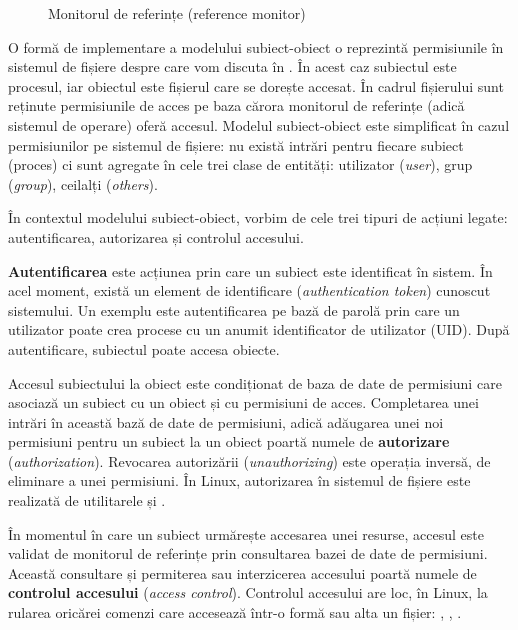 \begin{figure}[htbp]
  \centering
  \def\svgwidth{\columnwidth}
  
  \caption{Monitorul de referințe (reference monitor)}
  \label{fig:sec:reference-monitor}
\end{figure}

O formă de implementare a modelului subiect-obiect o reprezintă permisiunile în sistemul de fișiere despre care vom discuta în .
În acest caz subiectul este procesul, iar obiectul este fișierul care se dorește accesat.
În cadrul fișierului sunt reținute permisiunile de acces pe baza cărora monitorul de referințe (adică sistemul de operare) oferă accesul.
Modelul subiect-obiect este simplificat în cazul permisiunilor pe sistemul de fișiere: nu există intrări pentru fiecare subiect (proces) ci sunt agregate în cele trei clase de entități: utilizator (\textit{user}), grup (\textit{group}), ceilalți (\textit{others}).

În contextul modelului subiect-obiect, vorbim de cele trei tipuri de acțiuni legate: autentificarea, autorizarea și controlul accesului.

\textbf{Autentificarea} este acțiunea prin care un subiect este identificat în sistem.
În acel moment, există un element de identificare (\textit{authentication token}) cunoscut sistemului.
Un exemplu este autentificarea pe bază de parolă prin care un utilizator poate crea procese cu un anumit identificator de utilizator (UID).
După autentificare, subiectul poate accesa obiecte.

Accesul subiectului la obiect este condiționat de baza de date de permisiuni care asociază un subiect cu un obiect și cu permisiuni de acces.
Completarea unei intrări în această bază de date de permisiuni, adică adăugarea unei noi permisiuni pentru un subiect la un obiect poartă numele de \textbf{autorizare} (\textit{authorization}).
Revocarea autorizării (\textit{unauthorizing}) este operația inversă, de eliminare a unei permisiuni.
În Linux, autorizarea în sistemul de fișiere este realizată de utilitarele  și .

În momentul în care un subiect urmărește accesarea unei resurse, accesul este validat de monitorul de referințe prin consultarea bazei de date de permisiuni.
Această consultare și permiterea sau interzicerea accesului poartă numele de \textbf{controlul accesului} (\textit{access control}).
Controlul accesului are loc, în Linux, la rularea oricărei comenzi care accesează într-o formă sau alta un fișier: , , .

